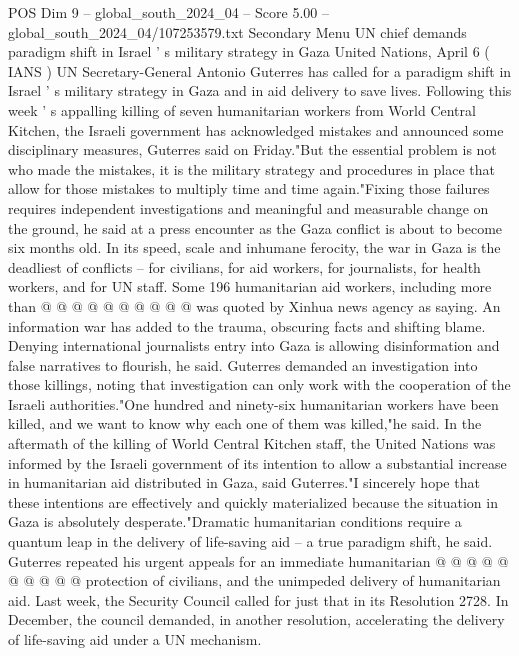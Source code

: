 \begin{textsample}{POS Dim 9 – global\_south\_2024\_04 – Score 5.00 – global\_south\_2024\_04/107253579.txt}  \label{ex:f9_pos_074}
Secondary Menu UN chief demands paradigm shift in Israel ' s military strategy in Gaza United Nations, April 6 ( IANS ) UN Secretary-General Antonio Guterres has called for a paradigm shift in Israel ' s military strategy in Gaza and in aid delivery to save lives.
Following this week ' s appalling killing of seven humanitarian workers from World Central Kitchen, the Israeli government has acknowledged mistakes and announced some disciplinary measures, Guterres said on Friday."But the essential problem is not who made the mistakes, it is the military strategy and procedures in place that allow for those mistakes to multiply time and time again."Fixing those failures requires independent investigations and meaningful and measurable change on the ground, he said at a press encounter as the Gaza conflict is about to become six months old.
In its speed, scale and inhumane ferocity, the war in Gaza is the deadliest of conflicts -- for civilians, for aid workers, for journalists, for health workers, and for UN staff.
Some 196 humanitarian aid workers, including more than @ @ @ @ @ @ @ @ @ @ was quoted by Xinhua news agency as saying.
An information war has added to the trauma, obscuring facts and shifting blame.
Denying international journalists entry into Gaza is allowing disinformation and false narratives to flourish, he said.
Guterres demanded an investigation into those killings, noting that investigation can only work with the cooperation of the Israeli authorities."One hundred and ninety-six humanitarian workers have been killed, and we want to know why each one of them was killed,"he said.
In the aftermath of the killing of World Central Kitchen staff, the United Nations was informed by the Israeli government of its intention to allow a substantial increase in humanitarian aid distributed in Gaza, said Guterres."I sincerely hope that these intentions are effectively and quickly materialized because the situation in Gaza is absolutely desperate."Dramatic humanitarian conditions require a quantum leap in the delivery of life-saving aid -- a true paradigm shift, he said.
Guterres repeated his urgent appeals for an immediate humanitarian @ @ @ @ @ @ @ @ @ @ protection of civilians, and the unimpeded delivery of humanitarian aid.
Last week, the Security Council called for just that in its Resolution 2728.
In December, the council demanded, in another resolution, accelerating the delivery of life-saving aid under a UN mechanism.

\end{textsample}
